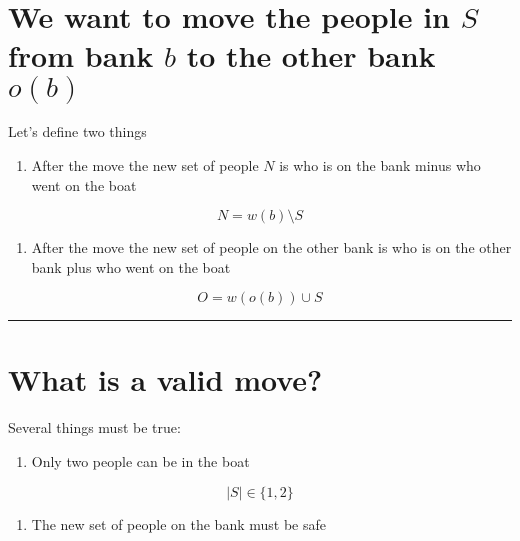 \documentclass{article}
\begin{document}
\section{\texorpdfstring{We want to move the people in \(S\) from bank
\(b\) to the other bank
\(o(b)\)}{We want to move the people in S from bank b to the other bank o(b)}}\label{we-want-to-move-the-people-in-s-from-bank-b-to-the-other-bank-ob}

Let's define two things

\begin{enumerate}
\def\labelenumi{\arabic{enumi}.}

\item
  After the move the new set of people \(N\) is who is on the bank minus
  who went on the boat
\end{enumerate}

\[N = w(b) \setminus S \tag{new on this bank}\]

\begin{enumerate}
\def\labelenumi{\arabic{enumi}.}
\setcounter{enumi}{1}

\item
  After the move the new set of people on the other bank is who is on
  the other bank plus who went on the boat
\end{enumerate}

\[O = w(o(b)) \cup S \tag{new on other bank}\]

\begin{center}\rule{0.5\linewidth}{0.5pt}\end{center}

\section{What is a valid move?}\label{what-is-a-valid-move}

Several things must be true:

\begin{enumerate}
\def\labelenumi{\arabic{enumi}.}

\item
  Only two people can be in the boat
\end{enumerate}

\[|S| \in \{ 1, 2 \} \tag{number in boat}\]

\begin{enumerate}
\def\labelenumi{\arabic{enumi}.}
\setcounter{enumi}{1}

\item
  The new set of people on the bank must be safe
\end{enumerate}
\end{document}
